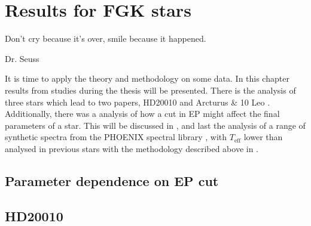 \chapter{Results for FGK stars}
\label{cha:results}
\epigraph{Don't cry because it's over, smile because it happened.}{Dr. Seuss}

It is time to apply the theory and methodology on some data. In this chapter results from studies
during the thesis will be presented. There is the analysis of three stars which lead to two papers,
HD20010 \citep{Andreasen2016} and Arcturus \& 10 Leo \citep{Andreasen2017b}. Additionally, there was
a analysis of how a cut in EP might affect the final parameters of a star. This will be discussed in
, and last the analysis of a range of synthetic spectra from the PHOENIX spectral
library \citep{Husser2013}, with $T_\mathrm{eff}$ lower than analysed in previous stars with the
methodology described above in .


\section{Parameter dependence on EP cut}
\label{sec:EPcut}


\section{HD20010}
\label{sec:HD20010}


